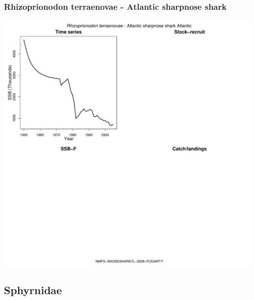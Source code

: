 \subsubsection{Rhizoprionodon terraenovae - Atlantic sharpnose shark}
\begin{center}
\includegraphics[width=1.2\textwidth]{../R/figures/NMFS-SNOSESHARATL-2006-FOGARTY.pdf}
\end{center}

\subsection{Sphyrnidae}

